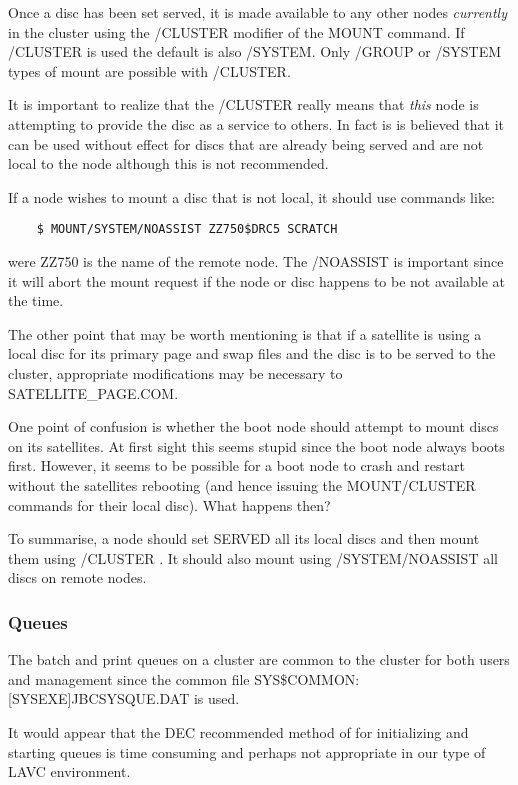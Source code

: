 Once a disc has been set served, it is made available to any other nodes
{\em currently} in the cluster using the /CLUSTER modifier of the MOUNT command.
If /CLUSTER is used the default is also /SYSTEM.
Only /GROUP or /SYSTEM types of mount are possible with /CLUSTER.

It is important to realize that the /CLUSTER really means that {\em this} node
is attempting to provide the disc as a service to others.
In fact is is believed that it can be used without effect for discs that are
already being served and are not local to the node although this is not
recommended.

If a node wishes to mount a disc that is not local, it should use commands like:
\begin{verbatim}
    $ MOUNT/SYSTEM/NOASSIST ZZ750$DRC5 SCRATCH
\end{verbatim}
were ZZ750 is the name of the remote node.
The /NOASSIST is important since it will abort the mount request if the node or
disc happens to be not available at the time.

The other point that may be worth mentioning is that if a satellite is using
a local disc for its primary page and swap files and the disc is to be served
to the cluster, appropriate modifications may be necessary to
SATELLITE\_PAGE.COM.

One point of confusion is whether the boot node should attempt to mount discs
on its satellites.
At first sight this seems stupid since the boot node always boots first.
However, it seems to be possible for a boot node to crash and restart without
the satellites rebooting (and hence issuing the MOUNT/CLUSTER commands for
their local disc).
What happens then?

To summarise, a node should set SERVED all its local discs and then mount them
using /CLUSTER .
It should also mount using /SYSTEM/NOASSIST all discs on remote nodes.

\subsubsection {Queues}

The batch and print queues on a cluster are common to the cluster for both users
and management since the common file SYS\$COMMON:[SYSEXE]JBCSYSQUE.DAT is used.

It would appear that the DEC recommended method of for initializing and
starting queues is time consuming and perhaps not appropriate in our type of
LAVC environment.

